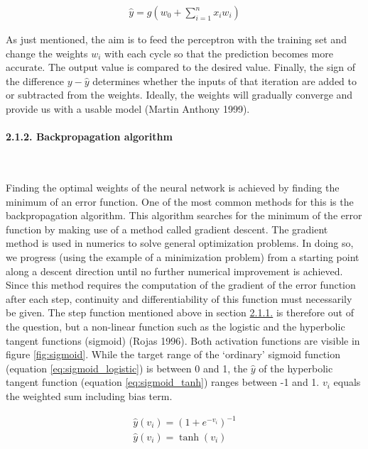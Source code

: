 \documentclass[
]{article}
\begin{document}
\begin{align} \label{eq:perceptron}
\hat{y}=g(w_{0}+\sum_{i=1}^{n}x_{i}w_{i})
\end{align}

As just mentioned, the aim is to feed the perceptron with the training
set and change the weights \(w_{i}\) with each cycle so that the
prediction becomes more accurate. The output value is compared to the
desired value. Finally, the sign of the difference \(y-\hat{y}\)
determines whether the inputs of that iteration are added to or
subtracted from the weights. Ideally, the weights will gradually
converge and provide us with a usable model (Martin Anthony 1999).

\newpage

\hypertarget{backprogation_algorithm}{%
\paragraph{2.1.2. Backpropagation
algorithm}\label{backprogation_algorithm}}

~

Finding the optimal weights of the neural network is achieved by finding
the minimum of an error function. One of the most common methods for
this is the backpropagation algorithm. This algorithm searches for the
minimum of the error function by making use of a method called gradient
descent. The gradient method is used in numerics to solve general
optimization problems. In doing so, we progress (using the example of a
minimization problem) from a starting point along a descent direction
until no further numerical improvement is achieved. Since this method
requires the computation of the gradient of the error function after
each step, continuity and differentiability of this function must
necessarily be given. The step function mentioned above in section
\protect\hyperlink{perceptron}{2.1.1.} is therefore out of the question,
but a non-linear function such as the logistic and the hyperbolic
tangent functions (sigmoid) (Rojas 1996). Both activation functions are
visible in figure \ref{fig:sigmoid}. While the target range of the
`ordinary' sigmoid function (equation \ref{eq:sigmoid_logistic}) is
between 0 and 1, the \(\hat{y}\) of the hyperbolic tangent function
(equation \ref{eq:sigmoid_tanh}) ranges between -1 and 1. \(v_{i}\)
equals the weighted sum including bias term.

\begin{eqnarray}
\hat{y}(v_{i})=(1+e^{-v_{i}})^{-1} \label{eq:sigmoid_logistic} \\
\hat{y}(v_{i})=\tanh(v_{i}) \label{eq:sigmoid_tanh}
\end{eqnarray}
\end{document}
